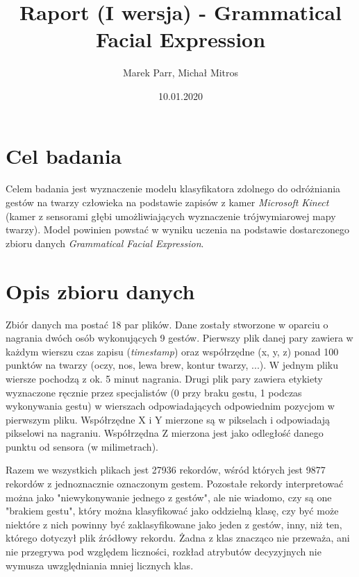 \documentclass[a4paper,12pt]{article}
\begin{document}
\title{Raport (I wersja) - Grammatical Facial Expression}
\author{Marek Parr, Michał Mitros}
\date{10.01.2020}
\maketitle

\newpage
\section{Cel badania}
\hspace{1cm}Celem badania jest wyznaczenie modelu klasyfikatora zdolnego do odróżniania gestów na twarzy człowieka na podstawie zapisów z kamer \textsl{Microsoft Kinect} (kamer z sensorami głębi umożliwiających wyznaczenie trójwymiarowej mapy twarzy). Model powinien powstać w wyniku uczenia na podstawie dostarczonego zbioru danych \textsl{Grammatical Facial Expression}.

\section{Opis zbioru danych}
\hspace{1cm}Zbiór danych ma postać 18 par plików. Dane zostały stworzone w oparciu o nagrania dwóch osób wykonujących 9 gestów. Pierwszy plik danej pary zawiera w każdym wierszu czas zapisu (\textsl{timestamp}) oraz współrzędne (x, y, z) ponad 100 punktów na twarzy (oczy, nos, lewa brew, kontur twarzy, ...). W jednym pliku wiersze pochodzą z ok. 5 minut nagrania. Drugi plik pary zawiera etykiety wyznaczone ręcznie przez specjalistów (0 przy braku gestu, 1 podczas wykonywania gestu) w wierszach odpowiadających odpowiednim pozycjom w pierwszym pliku.\newline
Współrzędne X i Y mierzone są w pikselach i odpowiadają pikselowi na nagraniu. Współrzędna Z mierzona jest jako odległość danego punktu od sensora (w milimetrach).\newline

\hspace{1cm}Razem we wszystkich plikach jest 27936 rekordów, wśród których jest 9877 rekordów z jednoznacznie oznaczonym gestem. Pozostałe rekordy interpretować można jako "niewykonywanie jednego z gestów", ale nie wiadomo, czy są one "brakiem gestu", który można klasyfikować jako oddzielną klasę, czy być może niektóre z nich powinny być zaklasyfikowane jako jeden z gestów, inny, niż ten, którego dotyczył plik źródłowy rekordu. Żadna z klas znacząco nie przeważa, ani nie przegrywa pod względem liczności, rozkład atrybutów decyzyjnych nie wymusza uwzględniania mniej licznych klas.
\end{document}
